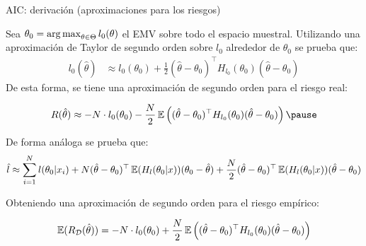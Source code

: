 \documentclass[handout, 9pt]{beamer}
\begin{document}
\begin{frame}{AIC: derivación (aproximaciones para los riesgos)}

Sea $\theta_0 = \operatorname*{arg\,max}_{\theta\in\Theta} l_0(\theta)$ el EMV sobre todo el espacio muestral. Utilizando una aproximación de Taylor de segundo orden sobre $l_0$ alrededor de $\theta_0$ se prueba que:
\begin{align*}
	l_0(\hat{\theta})&\approx l_0(\theta_0) + \frac{1}{2}(\hat{\theta}-\theta_0)^\top H_{l_0}(\theta_0) (\hat{\theta}-\theta_0)
\end{align*}\pause
De esta forma, se tiene una aproximación de segundo orden para el riesgo real:

\begin{equation*}
	R(\hat{\theta}) \approx -N \cdot l_0(\theta_0) - \frac{N}{2}\E\left((\hat{\theta}-\theta_0)^\top H_{l_0}(\theta_0) (\hat{\theta}-\theta_0)\right)\pause
\end{equation*}

De forma análoga se prueba que:
\begin{equation*}
	\hat{l} \approx \sum_{i=1}^N l(\theta_0|x_i) + N(\hat{\theta}-\theta_0)^\top \operatorname{\mathbb{E}}(H_l(\theta_0|x)) (\theta_0-\hat{\theta}) + \frac{N}{2}(\hat{\theta}-\theta_0)^\top \operatorname{\mathbb{E}}(H_l(\theta_0|x)) (\hat{\theta}-\theta_0)
\end{equation*}\pause

Obteniendo una aproximación de segundo orden para el riesgo empírico:

\begin{equation*}
	\operatorname{\mathbb{E}}(R_{\mathcal D}(\hat{\theta})) = -N\cdot l_0(\theta_0) + \frac{N}{2} \operatorname{\mathbb{E}}\left((\hat{\theta}-\theta_0)^\top H_{l_0}(\theta_0) (\hat{\theta}-\theta_0)\right)
\end{equation*}

	
\end{frame}
\end{document}
